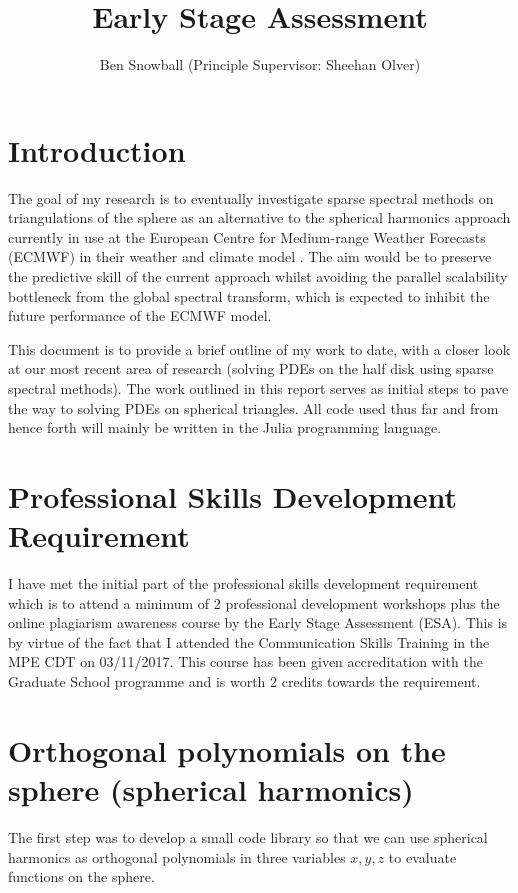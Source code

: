 \documentclass[11pt, oneside]{article}   	%
\title{Early Stage Assessment}
\author{Ben Snowball (Principle Supervisor: Sheehan Olver)}
\date{}							%
\begin{document}
\maketitle




\section{Introduction}

The goal of my research is to eventually investigate sparse spectral methods on triangulations of the sphere as an alternative to the spherical harmonics approach currently in use at the European Centre for Medium-range Weather Forecasts (ECMWF) in their weather and climate model \cite{wedi2013fast}. The aim would be to preserve the predictive skill of the current approach whilst avoiding the parallel scalability bottleneck from the global spectral transform, which is expected to inhibit the future performance of the ECMWF model.

This document is to provide a brief outline of my work to date, with a closer look at our most recent area of research (solving PDEs on the half disk using sparse spectral methods). The work outlined in this report serves as initial steps to pave the way to solving PDEs on spherical triangles. All code used thus far and from hence forth will mainly be written in the Julia programming language.

\section{Professional Skills Development Requirement}
I have met the initial part of the professional skills development requirement which is to attend a minimum of 2 professional development workshops plus the online plagiarism awareness course by the Early Stage Assessment (ESA).  This is by virtue of the fact that I attended the Communication Skills Training in the MPE CDT on 03/11/2017.  This course has been given accreditation with the Graduate School programme and is worth 2 credits towards the requirement.


\section{Orthogonal polynomials on the sphere (spherical harmonics)}

The first step was to develop a small code library so that we can use spherical harmonics as orthogonal polynomials in three variables $x, y, z$  to evaluate functions on the sphere. 
\end{document}
